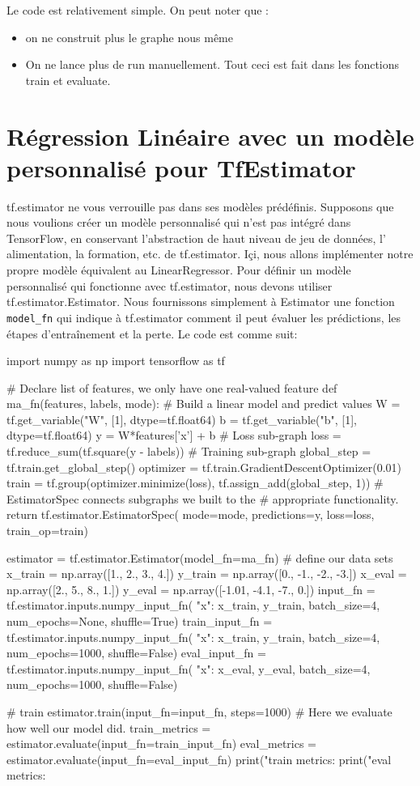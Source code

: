 \documentclass[a4paper,11pt]{book}
\theoremstyle{theo}
\begin{document}
Le code est relativement simple. On peut noter que :
\begin{itemize}
\item on ne construit plus le graphe nous même
\item On ne lance plus de run manuellement. Tout ceci est fait dans les fonctions train et evaluate.
\end{itemize}

\section{Régression Linéaire avec un modèle personnalisé pour TfEstimator}
tf.estimator ne vous verrouille pas dans ses modèles prédéfinis. Supposons que nous voulions créer un modèle personnalisé qui n'est pas intégré dans TensorFlow, en conservant  l'abstraction de haut niveau de jeu de données, l' alimentation, la formation, etc. de tf.estimator. Içi, nous allons implémenter notre propre modèle équivalent au LinearRegressor.
Pour définir un modèle personnalisé qui fonctionne avec tf.estimator, nous devons utiliser tf.estimator.Estimator.  Nous fournissons simplement à Estimator une fonction \verb+model_fn+ qui indique à tf.estimator comment il peut évaluer les prédictions, les étapes d'entraînement et la perte. Le code est comme suit:
\begin{mypython}
import numpy as np
import tensorflow as tf

# Declare list of features, we only have one real-valued feature
def ma_fn(features, labels, mode):
  # Build a linear model and predict values
  W = tf.get_variable("W", [1], dtype=tf.float64)
  b = tf.get_variable("b", [1], dtype=tf.float64)
  y = W*features['x'] + b
  # Loss sub-graph
  loss = tf.reduce_sum(tf.square(y - labels))
  # Training sub-graph
  global_step = tf.train.get_global_step()
  optimizer = tf.train.GradientDescentOptimizer(0.01)
  train = tf.group(optimizer.minimize(loss),
                   tf.assign_add(global_step, 1))
  # EstimatorSpec connects subgraphs we built to the
  # appropriate functionality.
  return tf.estimator.EstimatorSpec(
      mode=mode,
      predictions=y,
      loss=loss,
      train_op=train)

estimator = tf.estimator.Estimator(model_fn=ma_fn)
# define our data sets
x_train = np.array([1., 2., 3., 4.])
y_train = np.array([0., -1., -2., -3.])
x_eval = np.array([2., 5., 8., 1.])
y_eval = np.array([-1.01, -4.1, -7., 0.])
input_fn = tf.estimator.inputs.numpy_input_fn(
    {"x": x_train}, y_train, batch_size=4, num_epochs=None, shuffle=True)
train_input_fn = tf.estimator.inputs.numpy_input_fn(
    {"x": x_train}, y_train, batch_size=4, num_epochs=1000, shuffle=False)
eval_input_fn = tf.estimator.inputs.numpy_input_fn(
    {"x": x_eval}, y_eval, batch_size=4, num_epochs=1000, shuffle=False)

# train
estimator.train(input_fn=input_fn, steps=1000)
# Here we evaluate how well our model did.
train_metrics = estimator.evaluate(input_fn=train_input_fn)
eval_metrics = estimator.evaluate(input_fn=eval_input_fn)
print("train metrics: %
print("eval metrics: %
\end{mypython}
\end{document}
